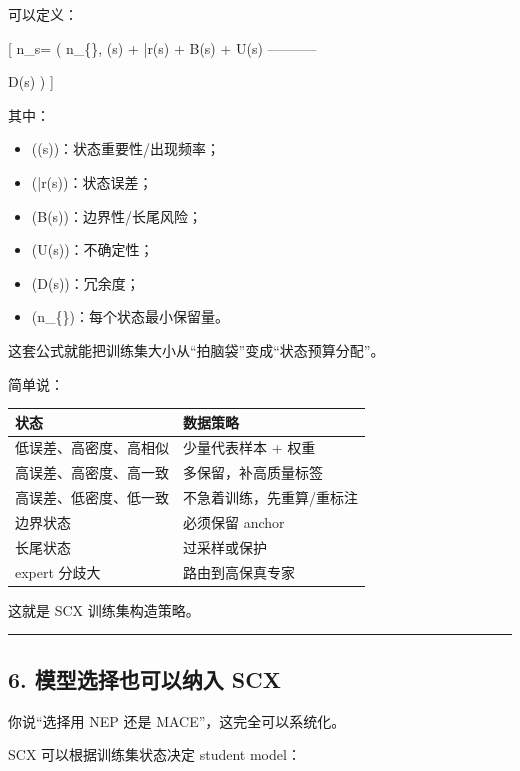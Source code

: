 \documentclass[
  12pt,
]{ctexart}
\providecommand{\tightlist}{%
  \setlength{\itemsep}{0pt}\setlength{\parskip}{0pt}}
\begin{document}
可以定义：

{[} n\_s= \max \left( n\_\{\min\}, \left\lceil \alpha \rho(s) +
\beta \bar r(s) + \gamma B(s) + \delta U(s) -----------

\eta D(s) \right\rceil \right) {]}

其中：

\begin{itemize}
\tightlist
\item
  (\rho(s))：状态重要性/出现频率；
\item
  (\bar r(s))：状态误差；
\item
  (B(s))：边界性/长尾风险；
\item
  (U(s))：不确定性；
\item
  (D(s))：冗余度；
\item
  (n\_\{\min\})：每个状态最小保留量。
\end{itemize}

这套公式就能把训练集大小从``拍脑袋''变成``状态预算分配''。

简单说：

\begin{longtable}[]{@{}ll@{}}
\toprule\noalign{}
状态 & 数据策略 \\
\midrule\noalign{}
\endhead
\bottomrule\noalign{}
\endlastfoot
低误差、高密度、高相似 & 少量代表样本 + 权重 \\
高误差、高密度、高一致 & 多保留，补高质量标签 \\
高误差、低密度、低一致 & 不急着训练，先重算/重标注 \\
边界状态 & 必须保留 anchor \\
长尾状态 & 过采样或保护 \\
expert 分歧大 & 路由到高保真专家 \\
\end{longtable}

这就是 SCX 训练集构造策略。

\begin{center}\rule{0.5\linewidth}{0.5pt}\end{center}

\subsection{6. 模型选择也可以纳入
SCX}\label{ux6a21ux578bux9009ux62e9ux4e5fux53efux4ee5ux7eb3ux5165-scx}

你说``选择用 NEP 还是 MACE''，这完全可以系统化。

SCX 可以根据训练集状态决定 student model：
\end{document}
